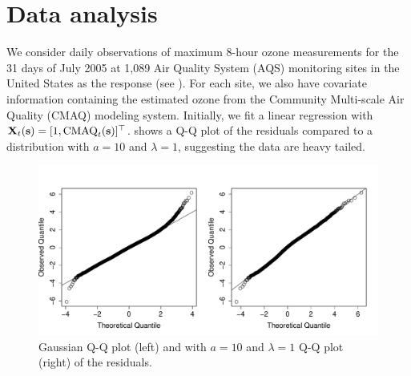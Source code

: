 \documentclass[useAMS,usenatbib,referee]{biom}
\begin{document}
\section{Data analysis}\label{sts:analysis}
We consider daily observations of maximum 8-hour ozone measurements for the 31 days of July 2005 at 1,089 Air Quality System (AQS) monitoring sites in the United States as the response (see ).
For each site, we also have covariate information containing the estimated ozone from the Community Multi-scale Air Quality (CMAQ) modeling system.
Initially, we fit a linear regression with $\mbox{\bf X}_t(\mbox{\bf s}) = [1, \text{CMAQ}_t(\mbox{\bf s})]^\top$. %
 shows a Q-Q plot of the residuals compared to a \skewt distribution with $a = 10$ and $\lambda = 1$, suggesting the data are heavy tailed.
\begin{figure}
  \centering
  \includegraphics[width=\linewidth]{plots/qq-res.pdf}
  \caption{Gaussian Q-Q plot (left) and \skewt with $a = 10$ and $\lambda = 1$ Q-Q plot (right) of the residuals.}
  \label{stfig:ozone-qq}
\end{figure}
\end{document}
